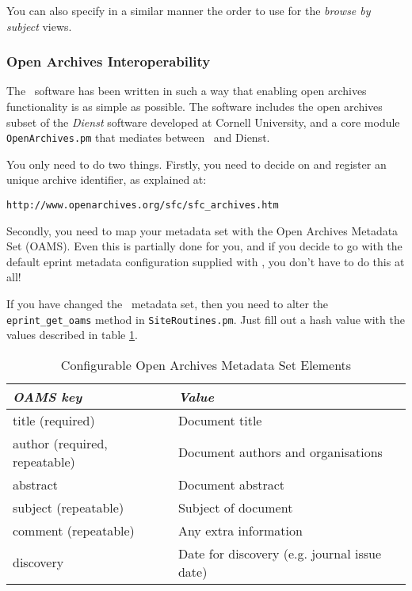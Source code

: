 You can also specify in a similar manner the order to use for the \emph{browse by subject} views.


\subsubsection{Open Archives Interoperability}

The \eprints\ software has been written in such a way that enabling open archives functionality is as simple as possible. The software includes the open archives subset of the \emph{Dienst} software developed at Cornell University, and a core module {\tt OpenArchives.pm} that mediates between \eprints\ and Dienst.

You only need to do two things. Firstly, you need to decide on and register an unique archive identifier, as explained at:

\begin{verbatim}
http://www.openarchives.org/sfc/sfc_archives.htm
\end{verbatim}

Secondly, you need to map your metadata set with the Open Archives Metadata Set (OAMS). Even this is partially done for you, and if you decide to go with the default eprint metadata configuration supplied with \eprints, you don't have to do this at all!

If you have changed the \eprints\ metadata set, then you need to alter the {\tt eprint\_get\_oams} method in {\tt SiteRoutines.pm}. Just fill out a hash value with the values described in table \ref{install_oams_hash}.

\begin{table}
\begin{center}
\begin{tabular}{|l|l|}
\hline
\emph{OAMS key}               & \emph{Value}                                 \\
\hline
title (required)              & Document title                               \\
author (required, repeatable) & Document authors and organisations           \\
abstract                      & Document abstract                            \\
subject (repeatable)          & Subject of document                          \\
comment (repeatable)          & Any extra information                        \\
discovery                     & Date for discovery (e.g. journal issue date) \\
\hline
\end{tabular}
\caption{\label{install_oams_hash} Configurable Open Archives Metadata Set Elements}
\end{center}
\end{table}

